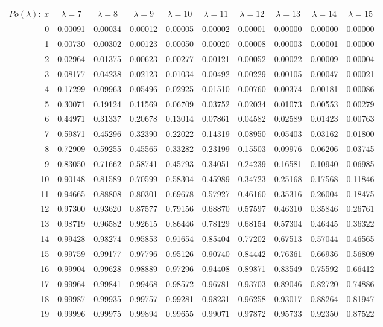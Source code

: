 \vspace{8pt minus 6pt}
\begin{tabular}{|r|c|c|c|c|c|c|c|c|c|}
\hline
$Po(\lambda)$: $x$
   & $\lambda=7$ & $\lambda=8$ & $\lambda=9$ & $\lambda=10$ & $\lambda=11$ & $\lambda=12$ & $\lambda=13$ & $\lambda=14$ & $\lambda=15$ \\\hline
  0&0.00091&0.00034&0.00012&0.00005&0.00002&0.00001&0.00000&0.00000&0.00000\\
  1&0.00730&0.00302&0.00123&0.00050&0.00020&0.00008&0.00003&0.00001&0.00000\\
  2&0.02964&0.01375&0.00623&0.00277&0.00121&0.00052&0.00022&0.00009&0.00004\\
  3&0.08177&0.04238&0.02123&0.01034&0.00492&0.00229&0.00105&0.00047&0.00021\\
  4&0.17299&0.09963&0.05496&0.02925&0.01510&0.00760&0.00374&0.00181&0.00086\\
  5&0.30071&0.19124&0.11569&0.06709&0.03752&0.02034&0.01073&0.00553&0.00279\\
  6&0.44971&0.31337&0.20678&0.13014&0.07861&0.04582&0.02589&0.01423&0.00763\\
  7&0.59871&0.45296&0.32390&0.22022&0.14319&0.08950&0.05403&0.03162&0.01800\\
  8&0.72909&0.59255&0.45565&0.33282&0.23199&0.15503&0.09976&0.06206&0.03745\\
  9&0.83050&0.71662&0.58741&0.45793&0.34051&0.24239&0.16581&0.10940&0.06985\\
 10&0.90148&0.81589&0.70599&0.58304&0.45989&0.34723&0.25168&0.17568&0.11846\\
 11&0.94665&0.88808&0.80301&0.69678&0.57927&0.46160&0.35316&0.26004&0.18475\\
 12&0.97300&0.93620&0.87577&0.79156&0.68870&0.57597&0.46310&0.35846&0.26761\\
 13&0.98719&0.96582&0.92615&0.86446&0.78129&0.68154&0.57304&0.46445&0.36322\\
 14&0.99428&0.98274&0.95853&0.91654&0.85404&0.77202&0.67513&0.57044&0.46565\\
 15&0.99759&0.99177&0.97796&0.95126&0.90740&0.84442&0.76361&0.66936&0.56809\\
 16&0.99904&0.99628&0.98889&0.97296&0.94408&0.89871&0.83549&0.75592&0.66412\\
 17&0.99964&0.99841&0.99468&0.98572&0.96781&0.93703&0.89046&0.82720&0.74886\\
 18&0.99987&0.99935&0.99757&0.99281&0.98231&0.96258&0.93017&0.88264&0.81947\\
 19&0.99996&0.99975&0.99894&0.99655&0.99071&0.97872&0.95733&0.92350&0.87522\\

\end{tabular}
